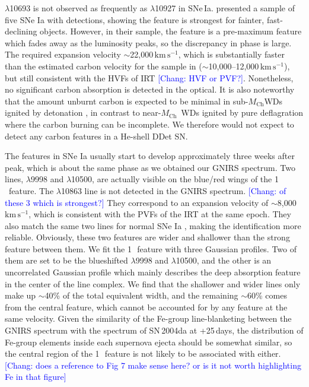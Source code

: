 \documentclass[twocolumn]{aastex631}
\newcommand{\Mch}{$M_\mathrm{Ch}$}
\newcommand{\kms}{$\mathrm{km}\,\mathrm{s}^{-1}$}
\newcommand{\chang}[1]{\textcolor{blue}{[Chang: #1]}}
\begin{document}
 $\lambda$10693 is not observed as frequently as  $\lambda$10927 in SNe\,Ia. \citet{Hsiao_CSP_2019} presented a sample of five SNe Ia with  detections, showing the  feature is strongest for fainter, fast-declining objects. However, in their sample, the  feature is a pre-maximum feature which fades away as the luminosity peaks, so the discrepancy in phase is large. The required expansion velocity $\sim$22,000\,\kms, which is substantially faster than the estimated carbon velocity for the sample in \citet{Hsiao_CSP_2019} ($\sim$10,000--12,000\,\kms), but still consistent with the HVFs of  IRT \chang{HVF or PVF?}. Nonetheless, no significant carbon absorption is detected in the optical. It is also noteworthy that the amount unburnt carbon is expected to be minimal in sub-\Mch WDs ignited by detonation \citep{polin_observational_2019}, in contrast to near-\Mch\ WDs ignited by pure deflagration where the carbon burning can be incomplete. We therefore would not expect to detect any carbon features in a He-shell DDet SN.

The  features in SNe Ia usually start to develop approximately three weeks after peak, which is about the same phase as we obtained our GNIRS spectrum. Two  lines, $\lambda$9998 and $\lambda$10500, are actually visible on the blue/red wings of the 1\,\micron\ feature. The  $\lambda$10863 line is not detected in the GNIRS spectrum. \chang{of these 3 which is strongest?} They correspond to an expansion velocity of $\sim$8,000\,\kms, which is consistent with the PVFs of the  IRT at the same epoch. They also match the same two lines for normal SNe Ia \citep{Marion2009_NIR}, making the identification more reliable. Obviously, these two  features are wider and shallower than the strong feature between them. We fit the 1\,\micron\ feature with three Gaussian profiles. Two of them are set to be the blueshifted  $\lambda$9998 and $\lambda$10500, and the other is an uncorrelated Gaussian profile which mainly describes the deep absorption feature in the center of the line complex. We find that the shallower and wider  lines only make up $\sim$40\% of the total equivalent width, and the remaining $\sim$60\% comes from the central feature, which cannot be accounted for by any  feature at the same velocity. Given the similarity of the Fe-group line-blanketing between the GNIRS spectrum with the spectrum of SN\,2004da at +25\,days, the distribution of Fe-group elements inside each supernova ejecta should be somewhat similar, so the central region of the 1\,\micron\ feature is not likely to be associated with  either. \chang{does a reference to Fig 7 make sense here? or is it not worth highlighting Fe in that figure}
\end{document}
